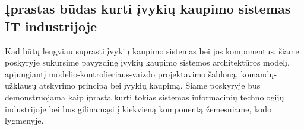 






\subsection{Įprastas būdas kurti įvykių kaupimo sistemas IT industrijoje}

Kad būtų lengviau suprasti įvykių kaupimo sistemas bei jos komponentus, šiame poskyryje sukursime pavyzdinę įvykių kaupimo sistemos architektūros modelį, apjungiantį modelio-kontrolieriaus-vaizdo projektavimo šabloną, komandų-užklausų atskyrimo principą bei įvykių kaupimą. Šiame poskyryje bus demonstruojama kaip įprasta kurti tokias sistemas informacinių technologijų industrijoje bei bus gilinamąsi į kiekvieną komponentą žemesniame, kodo lygmenyje.

